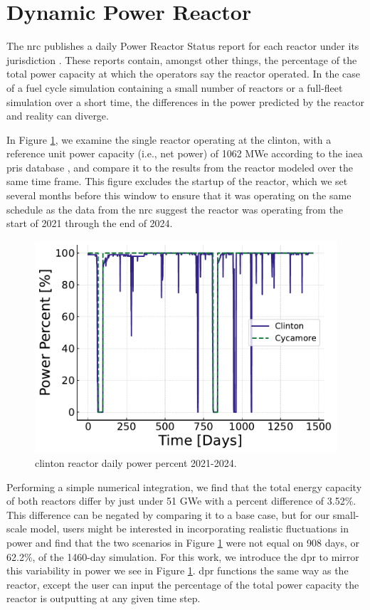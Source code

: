 \section{Dynamic Power Reactor}
\label{sec:dpr_method}

The \gls{nrc} publishes a daily Power Reactor Status report for each reactor
under its jurisdiction \cite{nrc_power_2025}. These reports contain, amongst
other things, the percentage of the total power capacity at which the operators
say the reactor operated. In the case of a fuel cycle simulation containing a
small number of reactors or a full-fleet simulation over a short time, the
differences in the power predicted by the \cycamore reactor and reality can
diverge.

In Figure \ref{fig:pp_full}, we examine the single reactor operating at the
\gls{clinton}, with a reference unit power capacity (i.e., net power) of 1062
MWe according to the \gls{iaea} \gls{pris} database \cite{IAEA_PRIS}, and
compare it to the results from the \cycamore reactor modeled over the same time
frame. This figure excludes the startup of the \cycamore reactor, which we set
several months before this window to ensure that it was operating on the same
schedule as the data from the \gls{nrc} suggest the reactor was operating
from the start of 2021 through the end of 2024.

\begin{figure}[H]
  \centering
  \includegraphics[width=0.7\linewidth]{images/power_reactor/power_percent_clinton_fake.pdf}
  \caption{\gls{clinton} reactor daily power percent 2021-2024.}
  \label{fig:pp_full}
\end{figure}

Performing a simple numerical integration, we find that the total energy
capacity of both reactors differ by just under 51 GWe with a percent difference
of 3.52\%. This difference can be negated by comparing it to a base case, but
for our small-scale model, users might be interested in incorporating realistic
fluctuations in power and find that the two scenarios in Figure
\ref{fig:pp_full} were not equal on 908 days, or 62.2\%, of the 1460-day
simulation. For this work, we introduce the \gls{dpr} to mirror this
variability in power we see in Figure \ref{fig:pp_full}. \gls{dpr} functions
the same way as the \cycamore reactor, except the user can input the percentage
of the total power capacity the reactor is outputting at any given time step.


